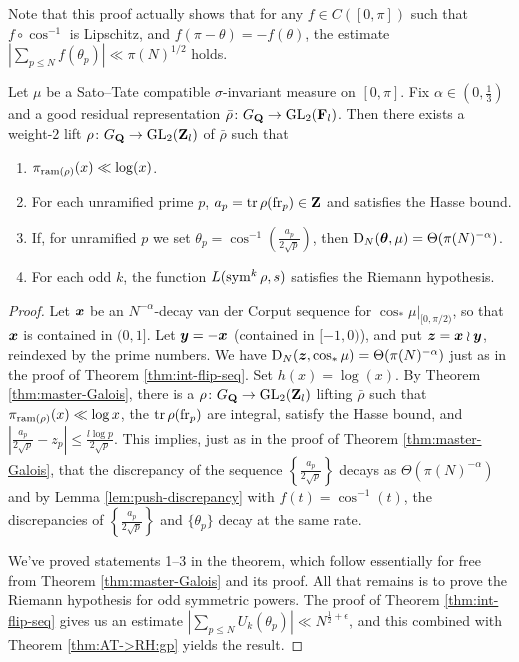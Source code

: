 Note that this proof actually shows that for any $f\in C([0,\pi])$ such 
that $f\circ \cos^{-1}$ is Lipschitz, and $f(\pi-\theta) = -f(\theta)$, the 
estimate $\left| \sum_{p\leqslant N} f(\theta_p)\right| \ll \pi(N)^{1/2}$ 
holds. 

\begin{theorem}\label{thm:bad-Galois}
Let $\mu$ be a Sato--Tate compatible $\sigma$-invariant measure on $[0,\pi]$. 
Fix $\alpha\in \left(0,\frac 1 3\right)$ and a good residual representation 
$\bar\rho\colon G_{\mathbf{Q}} \to \operatorname{GL}_2(\mathbf{F}_l)$. Then there exists a weight-$2$ lift 
$\rho\colon G_{\mathbf{Q}} \to \operatorname{GL}_2(\mathbf{Z}_l)$ of $\bar\rho$ such that 
\begin{enumerate}
\item
$\pi_{\mathrm{ram}(\rho)}(x) \ll \log(x)$. 

\item
For each unramified prime $p$, $a_p = \operatorname{tr}\rho(\mathrm{fr}_p)\in \mathbf{Z}$ and satisfies 
the Hasse bound. 

\item
If, for unramified $p$ we set 
$\theta_p = \cos^{-1}\left(\frac{a_p}{2\sqrt p}\right)$, then 
$\operatorname{D}_N({\boldsymbol\theta},\mu) = \Theta(\pi(N)^{-\alpha})$. 

\item
For each odd $k$, the function $L(\operatorname{sym}^k \rho,s)$ satisfies the Riemann 
hypothesis. 
\end{enumerate}
\end{theorem}
\begin{proof}
Let ${\boldsymbol x}$ be an $N^{-\alpha}$-decay van der Corput sequence for 
$\cos_\ast \left.\mu\right|_{[0,\pi/2)}$, so that ${\boldsymbol x}$ is contained in 
$(0,1]$. Let ${\boldsymbol y} = -{\boldsymbol x}$ (contained in $[-1,0)$), and put 
${\boldsymbol z} = {\boldsymbol x}\wr{\boldsymbol y}$, reindexed by the prime numbers. We have
$\operatorname{D}_N({\boldsymbol z},\cos_\ast\mu) = \Theta(\pi(N)^{-\alpha})$ just as in the proof 
of Theorem \ref{thm:int-flip-seq}. Set $h(x) = \log(x)$. By Theorem 
\ref{thm:master-Galois}, there is a $\rho\colon G_{\mathbf{Q}} \to \operatorname{GL}_2(\mathbf{Z}_l)$ lifting 
$\bar\rho$ such that $\pi_{\mathrm{ram}(\rho)}(x) \ll \log x$, the $\operatorname{tr} \rho(\mathrm{fr}_p)$ 
are integral, satisfy the Hasse bound, and 
$\left| \frac{a_p}{2\sqrt p} - z_p\right| \leqslant \frac{l \log p}{2\sqrt p}$. 
This implies, just as in the proof of Theorem \ref{thm:master-Galois}, that 
the discrepancy of the sequence $\left\{\frac{a_p}{2\sqrt p}\right\}$ decays 
as $\Theta(\pi(N)^{-\alpha})$ and by Lemma \ref{lem:push-discrepancy} with 
$f(t) = \cos^{-1}(t)$, the 
discrepancies of $\left\{\frac{a_p}{2\sqrt p}\right\}$ and $\{\theta_p\}$ 
decay at the same rate. 

We've proved statements 1--3 in the theorem, which follow essentially for free 
from Theorem \ref{thm:master-Galois} and its proof. All that remains is to prove 
the Riemann hypothesis for odd symmetric powers. The proof of Theorem 
\ref{thm:int-flip-seq} gives us an estimate 
$\left| \sum_{p\leqslant N} U_k(\theta_p)\right| \ll N^{\frac 1 2+\epsilon}$, 
and this combined with Theorem \ref{thm:AT->RH:gp} yields the result. 
\end{proof}


